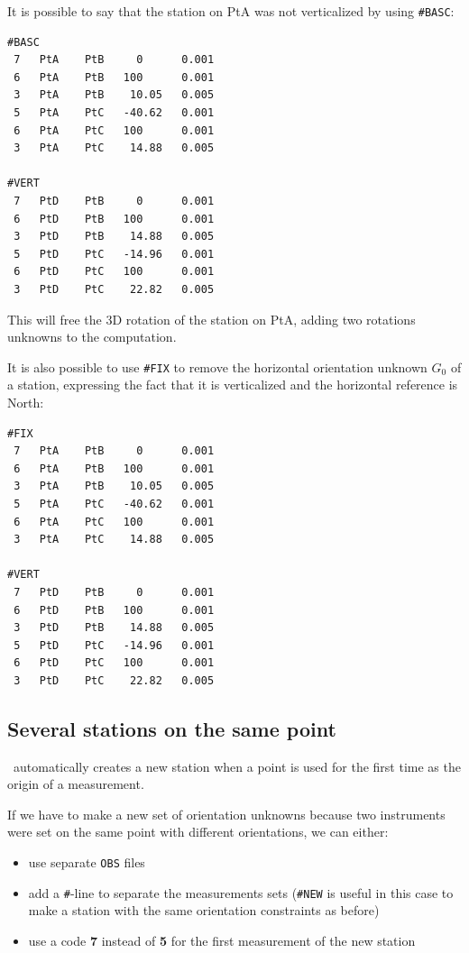 It is possible to say that the station on PtA was not verticalized by using \texttt{\#BASC}:
\begin{verbatim}
#BASC
 7   PtA    PtB     0      0.001
 6   PtA    PtB   100      0.001
 3   PtA    PtB    10.05   0.005
 5   PtA    PtC   -40.62   0.001
 6   PtA    PtC   100      0.001
 3   PtA    PtC    14.88   0.005

#VERT
 7   PtD    PtB     0      0.001
 6   PtD    PtB   100      0.001
 3   PtD    PtB    14.88   0.005
 5   PtD    PtC   -14.96   0.001
 6   PtD    PtC   100      0.001
 3   PtD    PtC    22.82   0.005
\end{verbatim}

This will free the 3D rotation of the station on PtA, adding two rotations unknowns to the computation.
\newline

It is also possible to use \texttt{\#FIX} to remove the horizontal orientation unknown $G_0$ of a station, expressing the fact that it
is verticalized and the horizontal reference is North:
\begin{verbatim}
#FIX
 7   PtA    PtB     0      0.001
 6   PtA    PtB   100      0.001
 3   PtA    PtB    10.05   0.005
 5   PtA    PtC   -40.62   0.001
 6   PtA    PtC   100      0.001
 3   PtA    PtC    14.88   0.005

#VERT
 7   PtD    PtB     0      0.001
 6   PtD    PtB   100      0.001
 3   PtD    PtB    14.88   0.005
 5   PtD    PtC   -14.96   0.001
 6   PtD    PtC   100      0.001
 3   PtD    PtC    22.82   0.005
\end{verbatim}


\subsection{Several stations on the same point}
\label{subsec:SeveralStationsSamePoint}

\CdPPP\ automatically creates a new station when a point is used for the first time as the origin of a measurement.

If we have to make a new set of orientation unknowns because two instruments were set on the same point with different
orientations, we can either:

\begin{itemize}
   \item use separate \texttt{OBS} files
   \item add a \texttt{\#}-line to separate the measurements sets (\texttt{\#NEW} is useful in this case to make a station with the same orientation constraints as before)
   \item use a code \textbf{7} instead of \textbf{5} for the first measurement of the new station
\end{itemize}


